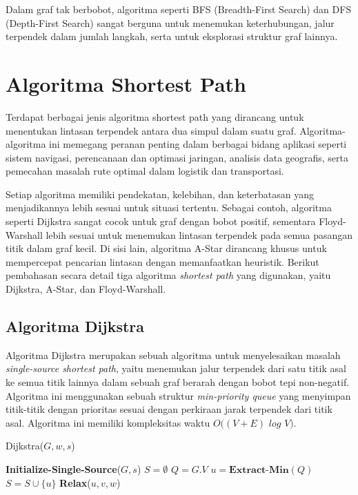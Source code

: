 Dalam graf tak berbobot, algoritma seperti BFS (Breadth-First Search) dan DFS (Depth-First Search) sangat berguna untuk menemukan keterhubungan, jalur terpendek dalam jumlah langkah, serta untuk eksplorasi struktur graf lainnya.



\section{Algoritma Shortest Path}
\label{sec:algoritmasp}
Terdapat berbagai jenis algoritma shortest path yang dirancang untuk menentukan lintasan terpendek antara dua simpul dalam suatu graf. Algoritma-algoritma ini memegang peranan penting dalam berbagai bidang aplikasi seperti sistem navigasi, perencanaan dan optimasi jaringan, analisis data geografis, serta pemecahan masalah rute optimal dalam logistik dan transportasi.

Setiap algoritma memiliki pendekatan, kelebihan, dan keterbatasan yang menjadikannya lebih sesuai untuk situasi tertentu. Sebagai contoh, algoritma seperti Dijkstra sangat cocok untuk graf dengan bobot positif, sementara Floyd-Warshall lebih sesuai untuk menemukan lintasan terpendek pada semua pasangan titik dalam graf kecil. Di sisi lain, algoritma A-Star dirancang khusus untuk mempercepat pencarian lintasan dengan memanfaatkan heuristik. Berikut pembahasan secara detail tiga algoritma \textit{shortest path} yang digunakan, yaitu {Dijkstra}, A-Star, dan Floyd-Warshall.

\subsection{Algoritma Dijkstra ~\cite{Cormen:09:intro}}
\label{sec:dijkstra}
Algoritma Dijkstra merupakan sebuah algoritma untuk menyelesaikan masalah \textit{single-source shortest path}, yaitu menemukan jalur terpendek dari satu titik asal ke semua titik lainnya dalam sebuah graf berarah dengan bobot tepi non-negatif. Algoritma ini menggunakan sebuah struktur \textit{min-priority queue} yang menyimpan titik-titik dengan prioritas sesuai dengan perkiraan jarak terpendek dari titik asal. Algoritma ini memiliki kompleksitas waktu $O((V+E)$ $log$ $V)$.
\begin{algorithm}[H]
    \caption{Dijkstra($G, w, s$)}
    \label{alg:dijkstra}
    \begin{algorithmic}[1]
    \State \textbf{Initialize-Single-Source}($G, s$)
    \State $S = \emptyset$
    \State $Q = G.V$
        \State $u = \textbf{Extract-Min}(Q)$
        \State $S = S \cup \{u\}$
            \State \textbf{Relax}($u, v, w$)
        \EndFor
    \EndWhile
    \end{algorithmic}
\end{algorithm}


